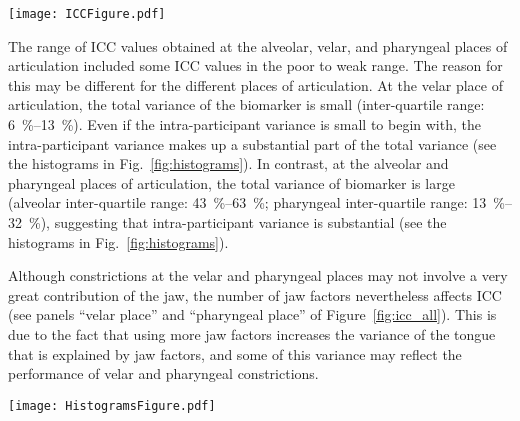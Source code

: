 \documentclass[preprint]{JASAnew}\usepackage[]{graphicx}\usepackage[]{color}
\begin{document}
\begin{figure*}
\raggedright

\texttt{[image: ICCFigure.pdf]}

\caption{(color online) Comparison of intraclass correlation coefficients (ICC) for different numbers of jaw factors (color) and for different numbers of tongue and lip factors ($x$-axis) at the bilabial, alveolar, palatal, velar, and pharyngeal places of articulation.}
\label{fig:icc_all}
\end{figure*}





The range of ICC values obtained at the alveolar, velar, and pharyngeal places of articulation included some ICC values in the poor to weak range. 
%
The reason for this may be different for the different places of articulation. 
%
At the velar place of articulation, the total variance of the biomarker is small
(inter-quartile range: \SIrange{6}{13}{\percent}). 
Even if the intra-participant variance is small to begin with, the intra-participant variance makes up a substantial part of the total variance (see the histograms in Fig.~\ref{fig:histograms}). 
%
In contrast, at the alveolar and pharyngeal places of articulation, the total variance of biomarker is large 
(alveolar inter-quartile range: \SIrange{43}{63}{\percent};
pharyngeal inter-quartile range: \SIrange{13}{32}{\percent}),
suggesting that intra-participant variance is substantial (see the histograms in Fig.~\ref{fig:histograms}). 

Although constrictions at the velar and pharyngeal places may not involve a very great contribution of the jaw, the number of jaw factors nevertheless affects ICC (see panels ``velar place'' and ``pharyngeal place'' of Figure~\ref{fig:icc_all}). This is due to the fact that using more jaw factors increases the variance of the tongue that is explained by jaw factors, and some of this variance may reflect the performance of velar and pharyngeal constrictions. 


\begin{figure*}

\texttt{[image: HistogramsFigure.pdf]}

\caption{\label{fig:histograms}(color online) 
Sample distribution of the jaw contributions to constrictions at the bilabial, alveolar, palatal, velar, and pharyngeal places of articulation. The quantity plotted is the percent of a constriction that was produced by the jaw.
A value of \SI{0}{\percent} indicates that lip or tongue motion produced the entire constriction, whereas a value of \SI{100}{\percent} indicates that jaw motion produced the entire constriction. 
Sample distribution by participant shown with a different color for each participant.}

\end{figure*}
\end{document}

